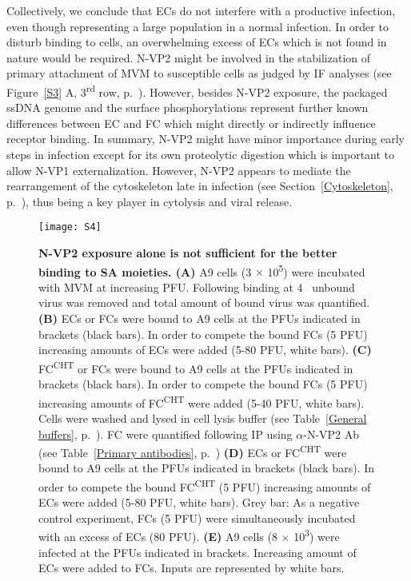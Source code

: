 Collectively, we conclude that ECs do not interfere with a productive infection, even though representing a large population in a normal infection. In order to disturb binding to cells, an overwhelming excess of ECs which is not found in nature would be required. N-VP2 might be involved in the stabilization of primary attachment of MVM to susceptible cells as judged by IF analyses (see Figure~\ref{S3} A, 3\textsuperscript{rd} row, p.~\pageref{S3}). However, besides N-VP2 exposure, the packaged ssDNA genome and the surface phosphorylations represent further known differences between EC and FC which might directly or indirectly influence receptor binding. In summary, N-VP2 might have minor importance during early steps in infection except for its own proteolytic digestion which is important to allow N-VP1 externalization. However, N-VP2 appears to mediate the rearrangement of the cytoskeleton late in infection (see Section~\ref{Cytoskeleton}, p.~\pageref{Cytoskeleton}), thus being a key player in cytolysis and viral release.        



\begin{figure}
\centering
  \texttt{[image: S4]} \\[0.3cm]
  \caption[N-VP2 Exposure Alone is not Sufficient for the Better Binding to SA Moieties]
   {\textbf{N-VP2 exposure alone is not sufficient for the better binding to SA moieties. (A)} A9 cells (3 $\times$ 10\textsuperscript{5}) were incubated with MVM at increasing PFU. Following binding at 4 \textcelsius~unbound virus was removed and total amount of bound virus was quantified. \textbf{(B)} ECs or FCs were bound to A9 cells at the PFUs indicated in brackets (black bars). In order to compete the bound FCs (5 PFU) increasing amounts of ECs were added (5-80 PFU, white bars). \textbf{(C)} FC\textsuperscript{CHT} or FCs were bound to A9 cells at the PFUs indicated in brackets (black bars). In order to compete the bound FCs (5 PFU) increasing amounts of FC\textsuperscript{CHT} were added (5-40 PFU, white bars). Cells were washed and lysed in cell lysis buffer (see Table~\ref{General buffers}, p.~\pageref{General buffers}). FC were quantified following IP using $\alpha$-N-VP2 Ab (see Table~\ref{Primary antibodies}, p.~\pageref{Primary antibodies}) \textbf{(D)} ECs or FC\textsuperscript{CHT} were bound to A9 cells at the PFUs indicated in brackets (black bars). In order to compete the bound FC\textsuperscript{CHT} (5 PFU) increasing amounts of ECs were added (5-80 PFU, white bars). Grey bar: As a negative control experiment, FCs (5 PFU) were simultaneously incubated with an excess of ECs (80 PFU). \textbf{(E)} A9 cells (8 $\times$ 10\textsuperscript{3}) were infected at the PFUs indicated in brackets. Increasing amount of ECs were added to FCs. Inputs are represented by white bars.} 
\label{S4}
\end{figure}







